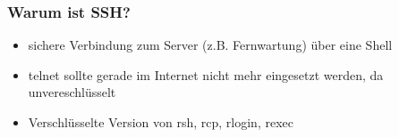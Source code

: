 \begin{frame}
\frametitle{Warum ist SSH?}
\begin{itemize}
\item sichere Verbindung zum Server (z.B. Fernwartung) über eine Shell
\pause 
\item telnet sollte gerade im Internet nicht mehr eingesetzt werden, da unvereschlüsselt
\pause
\item Verschlüsselte Version von rsh, rcp, rlogin, rexec
\end{itemize}
\end{frame}